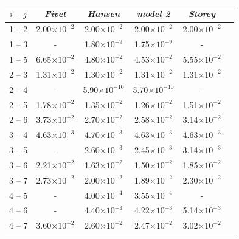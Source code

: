 %
\begin{table}[hbt!]
\footnotesize
\begin{center}
\begin{tabular}{@{} l *5c @{}}
      \hline
\multicolumn{1}{c}{ $i - j$}  & \textit{Fivet}  &  \textit{Hansen}   &  \textit{model 2}    &  \textit{Storey}  \\   
 \hline
\multicolumn{1}{c}{  1 -- 2}  & 2.00$\times 10^{-2}$    & 2.00$\times 10^{-2}$    &   2.00$\times 10^{-2}$  &      2.00$\times 10^{-2}$ \\
\multicolumn{1}{c}{  1 -- 3}  & - & 1.80$\times 10^{-9}$ &  1.75$\times 10^{-9}$   & -  \\
\multicolumn{1}{c}{  1 -- 5}  & 6.65$\times 10^{-2}$    & 4.80$\times 10^{-2}$  &  4.53$\times 10^{-2}$   &  5.55$\times 10^{-2}$  \\
\multicolumn{1}{c}{  2 -- 3}  &  1.31$\times 10^{-2}$    &1.30$\times 10^{-2}$ &  1.31$\times 10^{-2}$   & 1.31$\times 10^{-2}$ \\
\multicolumn{1}{c}{  2 -- 4}  &   -   &5.90$\times 10^{-10}$  &  5.70$\times 10^{-10}$ &  -   \\
\multicolumn{1}{c}{  2 --  5}  &1.78$\times 10^{-2}$    & 1.35$\times 10^{-2}$    &  1.26$\times 10^{-2}$  &     1.51$\times 10^{-2}$ \\
\multicolumn{1}{c}{  2  -- 6}  & 3.73$\times 10^{-2}$    & 2.70$\times 10^{-2}$     &  2.58$\times 10^{-2}$  &   3.14$\times 10^{-2}$  \\
\multicolumn{1}{c}{  3  -- 4}  &4.63$\times 10^{-3}$    &  4.70$\times 10^{-3}$   &  4.63$\times 10^{-3}$  &   4.63$\times 10^{-3}$  \\
\multicolumn{1}{c}{  3  -- 5} &   -     &  2.60$\times 10^{-3}$   &   2.45$\times 10^{-3}$  &    3.14$\times 10^{-3}$  \\
\multicolumn{1}{c}{  3  -- 6}  &2.21$\times 10^{-2}$    &  1.63$\times 10^{-2}$  &    1.50$\times 10^{-2}$  &     1.85$\times 10^{-2}$   \\
\multicolumn{1}{c}{  3 --  7}  &2.73$\times 10^{-2}$    &  2.00$\times 10^{-2}$    &   1.89$\times 10^{-2}$  &     2.30$\times 10^{-2}$ \\
\multicolumn{1}{c}{  4 --  5}  & -    &  4.00$\times 10^{-4}$  &  3.55$\times 10^{-4}$   &   - \\
\multicolumn{1}{c}{  4  -- 6}  & -    &  4.40$\times 10^{-3}$     &  4.22$\times 10^{-3}$  &  5.14$\times 10^{-3}$ \\
\multicolumn{1}{c}{  4 --  7}  & 3.60$\times 10^{-2}$    &  2.60$\times 10^{-2}$   &  2.47$\times 10^{-2}$  &    3.02$\times 10^{-2}$  \\

\end{tabular}
\end{center}
\end{table}
